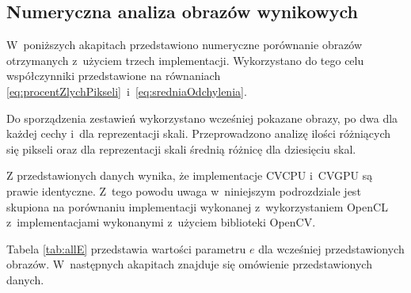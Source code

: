 \subsection{Numeryczna analiza obrazów wynikowych}
\label{subsec:porownanieNumerycznePoprawnosc}

W~poniższych akapitach przedstawiono numeryczne porównanie obrazów otrzymanych z~użyciem trzech implementacji. Wykorzystano do tego celu współczynniki przedstawione na równaniach \eqref{eq:procentZlychPikseli}~i~\eqref{eq:sredniaOdchylenia}.

Do sporządzenia zestawień wykorzystano wcześniej pokazane obrazy, po dwa dla każdej cechy i~dla reprezentacji skali. Przeprowadzono analizę ilości różniących się pikseli oraz dla reprezentacji skali średnią różnicę dla dziesięciu skal. 

Z przedstawionych danych wynika, że implementacje CVCPU i~CVGPU są prawie identyczne. Z~tego powodu uwaga w~niniejszym podrozdziale jest skupiona na porównaniu implementacji wykonanej z~wykorzystaniem OpenCL z~implementacjami wykonanymi z~użyciem biblioteki OpenCV.

Tabela \ref{tab:allE} przedstawia wartości parametru $ e $ dla wcześniej przedstawionych obrazów. W~następnych akapitach znajduje się omówienie przedstawionych danych.


